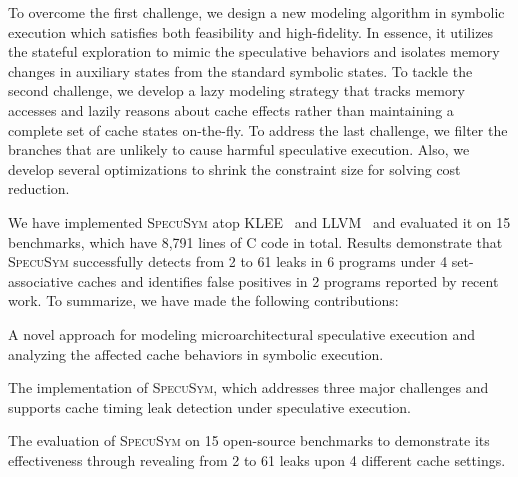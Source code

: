 \documentclass[sigconf]{acmart}
\newcommand\ignore[1]{}
\newcommand{\SpecuSym}{\textsc{SpecuSym} }
\begin{document}
To overcome the first challenge, we design a new modeling algorithm in symbolic 
execution which satisfies both feasibility and high-fidelity. In essence, it 
utilizes the stateful exploration to mimic the speculative behaviors and isolates 
memory changes in auxiliary states from the standard symbolic states.
%
To tackle the second challenge, we develop a lazy modeling strategy that tracks 
memory accesses and lazily reasons about cache effects rather than maintaining a 
complete set of cache states on-the-fly. 
%
To address the last challenge, we filter the branches that are unlikely to cause 
harmful speculative execution. Also, we develop several optimizations to shrink 
the constraint size for solving cost reduction.



\ignore{
Also, We develop a merging schema between the mimicked states and regular symbolic 
states to accumulate the cache side effects.

In general, we decompose the precise but lengthy constraint into smaller chunks 
without losing correctness, as well as utilizing executor kernel characteristics 
for faster computation.

However, the side effects caused by speculative execution are normally undetectable 
under standard symbolic execution. To overcome this problem, we introduce the 
$\mathit{speculative~modeling}$ into symbolic execution. Thus, cache side effects 
are visible and cache timing leaks from speculative execution detectable now. 
}


We have implemented \SpecuSym atop KLEE~\cite{CadarDE08} and LLVM~\cite{LattnerA04} 
and evaluated it on 15 benchmarks, which have 8,791 lines of C code in total. Results 
demonstrate that \SpecuSym successfully detects from 2 to 61 leaks in 6 programs under
4 set-associative caches and identifies false positives in 2 programs reported by recent 
work. To summarize, we have made the following contributions:


\begin{itemize*}
  \item 
    A novel approach for modeling microarchitectural speculative execution and 
		analyzing the affected cache behaviors in symbolic execution.
  \item 
		The implementation of \textsc{SpecuSym}, which addresses three major challenges
		and supports cache timing leak detection under speculative execution. 
  \item 
    The evaluation of \SpecuSym on 15 open-source benchmarks to demonstrate its 
    effectiveness through revealing from 2 to 61 leaks upon 4 different cache settings.
\end{itemize*}
\end{document}

